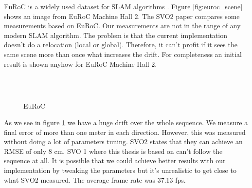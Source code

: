 \documentclass[11pt,a4paper,titlepage,oneside]{report}
\begin{document}
EuRoC is a widely used dataset for SLAM algorithms \cite{euroc}. Figure \ref{fig:euroc_scene} shows an image from EuRoC Machine Hall 2. The SVO2 paper \cite{svo2} compares some measurements based on EuRoC. Our measurements are not in the range of any modern SLAM algorithm. The problem is that the current implementation doesn't do a relocation (local or global). Therefore, it can't profit if it sees the same scene more than once what increases the drift. For completeness an initial result is shown anyhow for EuRoC Machine Hall 2.

\begin{figure}[H]
  \\
  \\
  \caption{EuRoC }\label{fig:euroc}
\end{figure}

As we see in figure \ref{fig:euroc} we have a huge drift over the whole sequence. We measure a final error of more than one meter in each direction. However, this was measured without doing a lot of parameters tuning. SVO2 states that they can achieve an RMSE of only 8 cm. SVO 1 where this thesis is based on can't follow the sequence at all. It is possible that we could achieve better results with our implementation by tweaking the parameters but it's unrealistic to get close to what SVO2 measured. The average frame rate was 37.13 fps.
\end{document}
